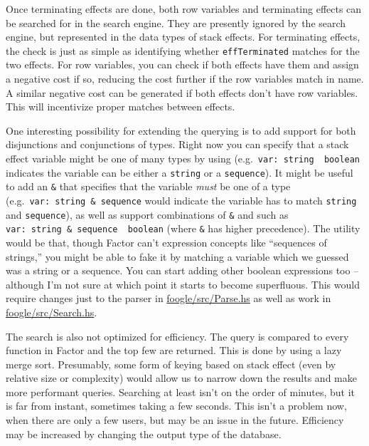 \documentclass[
]{article}
\begin{document}
Once terminating effects are done, both row variables and terminating
effects can be searched for in the search engine. They are presently
ignored by the search engine, but represented in the data types of stack
effects. For terminating effects, the check is just as simple as
identifying whether \texttt{effTerminated} matches for the two effects.
For row variables, you can check if both effects have them and assign a
negative cost if so, reducing the cost further if the row variables
match in name. A similar negative cost can be generated if both effects
don't have row variables. This will incentivize proper matches between
effects.

One interesting possibility for extending the querying is to add support
for both disjunctions and conjunctions of types. Right now you can
specify that a stack effect variable might be one of many types by using
\texttt{\textbar{}} (e.g.~\texttt{var:\ string\ \textbar{}\ boolean}
indicates the variable can be either a \texttt{string} or a
\texttt{sequence}). It might be useful to add an \texttt{\&} that
specifies that the variable \emph{must} be one of a type
(e.g.~\texttt{var:\ string\ \&\ sequence} would indicate the variable
has to match \texttt{string} and \texttt{sequence}), as well as support
combinations of \texttt{\&} and \texttt{\textbar{}} such as
\texttt{var:\ string\ \&\ sequence\ \textbar{}\ boolean} (where
\texttt{\&} has higher precedence). The utility would be that, though
Factor can't expression concepts like ``sequences of strings,'' you
might be able to fake it by matching a variable which we guessed was a
string or a sequence. You can start adding other boolean expressions too
-- although I'm not sure at which point it starts to become superfluous.
This would require changes just to the parser in
\href{https://github.com/factor-hmc/foogle/blob/master/src/Parse.hs}{foogle/src/Parse.hs}
as well as work in
\href{https://github.com/factor-hmc/foogle/blob/master/src/Search.hs}{foogle/src/Search.hs}.

The search is also not optimized for efficiency. The query is compared
to every function in Factor and the top few are returned. This is done
by using a lazy merge sort. Presumably, some form of keying based on
stack effect (even by relative size or complexity) would allow us to
narrow down the results and make more performant queries. Searching at
least isn't on the order of minutes, but it is far from instant,
sometimes taking a few seconds. This isn't a problem now, when there are
only a few users, but may be an issue in the future. Efficiency may be
increased by changing the output type of the database.
\end{document}
